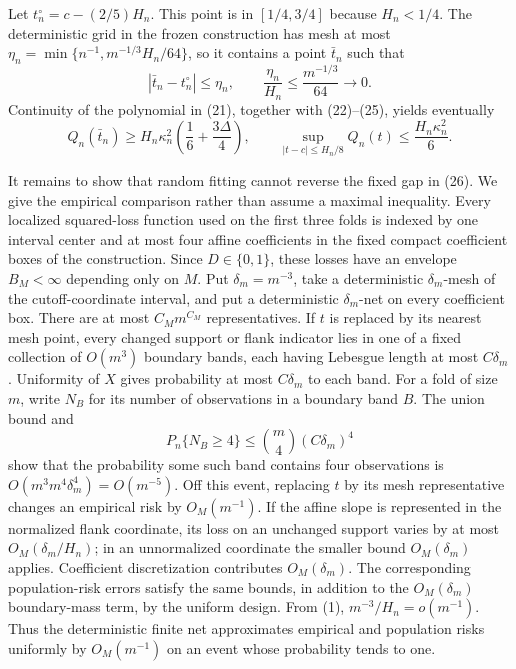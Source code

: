 Let \(t_n^\circ=c-(2/5)H_n\).  This point is in \([1/4,3/4]\) because
\(H_n<1/4\).  The deterministic grid in the frozen construction has
mesh at most
\(\eta_n=\min\{n^{-1},m^{-1/3}H_n/64\}\), so it contains a point
\(\bar t_n\) such that
\[
 |\bar t_n-t_n^\circ|\le\eta_n,
 \qquad
 \frac{\eta_n}{H_n}\le\frac{m^{-1/3}}{64}\longrightarrow0.
 \tag{25}
\]
Continuity of the polynomial in (21), together with (22)--(25), yields
eventually
\[
 Q_n(\bar t_n)
 \ge H_n\kappa_n^2\left(\frac16+\frac{3\Delta}{4}\right),
 \qquad
 \sup_{|t-c|\le H_n/8}Q_n(t)
 \le\frac{H_n\kappa_n^2}{6}.
 \tag{26}
\]

It remains to show that random fitting cannot reverse the fixed gap in
(26).  We give the empirical comparison rather than assume a maximal
inequality.  Every localized squared-loss function used on the first
three folds is indexed by one interval center and at most four affine
coefficients in the fixed compact coefficient boxes of the
construction.  Since \(D\in\{0,1\}\), these losses have an envelope
\(B_M<\infty\) depending only on \(M\).  Put
\(\delta_m=m^{-3}\), take a deterministic \(\delta_m\)-mesh of the
cutoff-coordinate interval, and put a deterministic
\(\delta_m\)-net on every coefficient box.  There are at most
\(C_Mm^{C_M}\) representatives.  If \(t\) is replaced by its nearest
mesh point, every changed support or flank indicator lies in one of a
fixed collection of \(O(m^3)\) boundary bands, each having Lebesgue
length at most \(C\delta_m\).  Uniformity of \(X\) gives probability at
most \(C\delta_m\) to each band.  For a fold of size \(m\), write
\(N_B\) for its number of observations in a boundary band \(B\).  The
union bound and
\[
 P_n\{N_B\ge4\}\le {m\choose4}(C\delta_m)^4
\]
show that the probability some such band contains four observations
is \(O(m^3m^4\delta_m^4)=O(m^{-5})\).  Off this event, replacing \(t\)
by its mesh representative changes an empirical risk by
\(O_M(m^{-1})\).  If the affine slope is represented in the normalized
flank coordinate, its loss on an unchanged support varies by at most
\(O_M(\delta_m/H_n)\); in an unnormalized coordinate the smaller bound
\(O_M(\delta_m)\) applies.  Coefficient discretization contributes
\(O_M(\delta_m)\).  The corresponding population-risk errors satisfy
the same bounds, in addition to the \(O_M(\delta_m)\) boundary-mass
term, by the uniform design.  From (1),
\(m^{-3}/H_n=o(m^{-1})\).  Thus the deterministic finite net
approximates empirical and population risks uniformly by
\(O_M(m^{-1})\) on an event whose probability tends to one.

